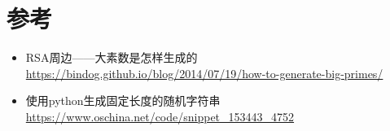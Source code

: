 \documentclass[a4paper]{article}
\begin{document}
\section{参考}
\begin{itemize}
    \item RSA周边——大素数是怎样生成的\\\hyperref[wef]{https://bindog.github.io/blog/2014/07/19/how-to-generate-big-primes/}
    \item 使用python生成固定长度的随机字符串\\\hyperref[fwe]{https://www.oschina.net/code/snippet\_153443\_4752}
\end{itemize}
\end{document}
